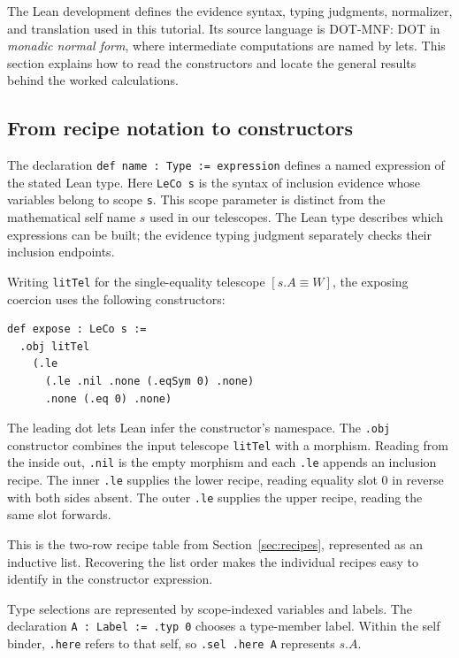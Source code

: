 \label{sec:lean}

The Lean development defines the evidence syntax, typing judgments,
normalizer, and translation used in this tutorial. Its source language
is DOT-MNF: DOT in \emph{monadic normal form}, where intermediate
computations are named by lets. This section explains how to read the
constructors and locate the general results behind the worked calculations.

\subsection*{From recipe notation to constructors}
The declaration \texttt{def name : Type := expression} defines a named
expression of the stated Lean type.
Here \texttt{LeCo s} is the syntax of inclusion evidence whose variables
belong to scope \texttt{s}. This scope parameter is distinct from the
mathematical self name $s$ used in our telescopes.
The Lean type describes which expressions can be built; the evidence
typing judgment separately checks their inclusion endpoints.

Writing \texttt{litTel} for the single-equality telescope
$[s.A\equiv W]$, the exposing coercion uses the following constructors:
\begin{lstlisting}
def expose : LeCo s :=
  .obj litTel
    (.le
      (.le .nil .none (.eqSym 0) .none)
      .none (.eq 0) .none)
\end{lstlisting}
The leading dot lets Lean infer the constructor's namespace.
The \texttt{.obj} constructor combines the input telescope
\texttt{litTel} with a morphism. Reading from the inside out,
\texttt{.nil} is the empty morphism and each \texttt{.le} appends an
inclusion recipe. The inner \texttt{.le} supplies the lower recipe,
reading equality slot 0 in reverse with both sides absent.
The outer \texttt{.le} supplies the upper recipe, reading the same slot
forwards.

This is the two-row recipe table from Section~\ref{sec:recipes},
represented as an inductive list. Recovering the list order makes the
individual recipes easy to identify in the constructor expression.

Type selections are represented by scope-indexed variables and labels.
The declaration \texttt{A : Label := .typ 0} chooses a type-member label.
Within the self binder, \texttt{.here} refers to that self, so
\texttt{.sel .here A} represents $s.A$.

